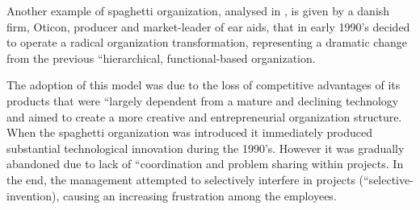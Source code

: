 Another example of spaghetti organization, analysed in \cite{5}, is given by a danish firm, Oticon, producer and market-leader of ear aids, that in early 1990’s decided to operate a radical organization transformation, representing a dramatic change from the previous ``hierarchical, functional-based organization.

The adoption of this model was due to the loss of competitive advantages of its products that were ``largely dependent from a mature and declining technology and aimed to create a more creative and entrepreneurial organization structure. When the spaghetti organization was introduced it immediately produced substantial technological innovation during the 1990’s.
However it was gradually abandoned due to lack of ``coordination and problem sharing within projects. In the end, the management attempted to selectively interfere in projects (``selective-invention), causing an increasing frustration among the employees.
